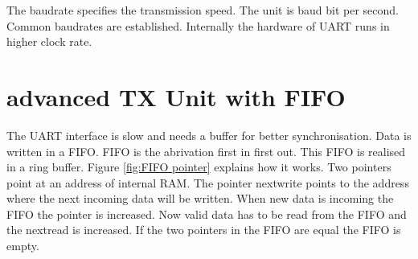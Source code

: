 \documentclass[a4paper,11pt]{article}
\begin{document}
The baudrate specifies the transmission speed. The unit is baud bit per second.  Common baudrates are established. 
Internally the hardware of UART runs in higher clock rate.

\section{advanced TX Unit with FIFO}
The UART interface is slow and needs a buffer for better synchronisation. Data is written in a FIFO. FIFO is the abrivation first in first out. This FIFO is realised in a ring buffer. Figure \ref{fig:FIFO pointer} explains how it works. Two pointers point at an address of internal RAM. The pointer nextwrite points to the address where the next incoming data will be written. When new data is incoming the FIFO the pointer is increased. Now valid data has to be read from the FIFO  and the nextread is increased. If the two pointers in the FIFO are equal the FIFO is empty.
\end{document}
